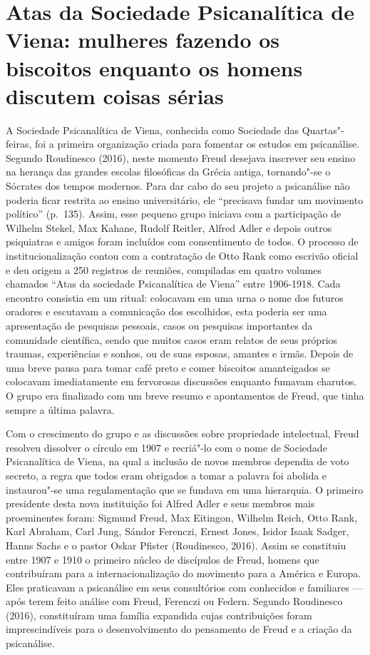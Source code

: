 \section{Atas da Sociedade Psicanalítica de Viena: mulheres fazendo os
biscoitos enquanto os homens discutem coisas sérias }

A Sociedade Psicanalítica de Viena, conhecida como Sociedade das
Quartas"-feiras, foi a primeira organização criada para fomentar os
estudos em psicanálise. Segundo Roudinesco (2016), neste momento Freud
desejava inscrever seu ensino na herança das grandes escolas filosóficas
da Grécia antiga, tornando"-se o Sócrates dos tempos modernos. Para dar
cabo do seu projeto a psicanálise não poderia ficar restrita ao ensino
universitário, ele ``precisava fundar um movimento político'' (p.~135).
Assim, esse pequeno grupo iniciava com a participação de Wilhelm Stekel,
Max Kahane, Rudolf Reitler, Alfred Adler e depois outros psiquiatras e
amigos foram incluídos com consentimento de todos. O processo de
institucionalização contou com a contratação de Otto Rank como escrivão
oficial e deu origem a 250 registros de reuniões, compiladas em quatro
volumes chamados ``Atas da sociedade Psicanalítica de Viena'' entre
1906-1918. Cada encontro consistia em um ritual: colocavam em uma urna o
nome dos futuros oradores e escutavam a comunicação dos escolhidos, esta
poderia ser uma apresentação de pesquisas pessoais, casos ou pesquisas
importantes da comunidade científica, sendo que muitos casos eram
relatos de seus próprios traumas, experiências e sonhos, ou de suas
esposas, amantes e irmãs. Depois de uma breve pausa para tomar café
preto e comer biscoitos amanteigados se colocavam imediatamente em
fervorosas discussões enquanto fumavam charutos. O grupo era finalizado
com um breve resumo e apontamentos de Freud, que tinha sempre a última
palavra.

Com o crescimento do grupo e as discussões sobre propriedade
intelectual, Freud resolveu dissolver o círculo em 1907 e recriá"-lo com
o nome de Sociedade Psicanalítica de Viena, na qual a inclusão de novos
membros dependia de voto secreto, a regra que todos eram obrigados a
tomar a palavra foi abolida e instaurou"-se uma regulamentação que se
fundava em uma hierarquia. O primeiro presidente desta nova instituição
foi Alfred Adler e seus membros mais proeminentes foram: Sigmund Freud,
Max Eitingon, Wilhelm Reich, Otto Rank, Karl Abraham, Carl Jung, Sándor
Ferenczi, Ernest Jones, Isidor Isaak Sadger, Hanns Sachs e o pastor
Oskar Pfister (Roudinesco, 2016). Assim se constituiu entre 1907 e 1910
o primeiro núcleo de discípulos de Freud, homens que contribuíram para a
internacionalização do movimento para a América e Europa. Eles
praticavam a psicanálise em seus consultórios com conhecidos e
familiares --- após terem feito análise com Freud, Ferenczi ou Federn.
Segundo Roudinesco (2016), constituíram uma família expandida cujas
contribuições foram imprescindíveis para o desenvolvimento do pensamento
de Freud e a criação da psicanálise.

